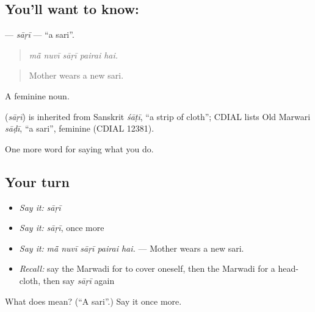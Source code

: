 \subsection*{You'll want to know: }
\textbf{} — \emph{sāṛī} — \textquotedblleft{}a sari\textquotedblright{}.

\begin{quote}
    
\end{quote}

\begin{quote}
\emph{mā̃ nuvī sāṛī pairai hai.}
\end{quote}

\begin{quote}
Mother wears a new sari.
\end{quote}

A feminine noun.

\begin{cousinweb}
\textbf{} (\emph{sāṛī}) is inherited from Sanskrit \emph{śāṭī}, \textquotedblleft{}a strip of cloth\textquotedblright{}; CDIAL lists Old Marwari \emph{sāḍī}, \textquotedblleft{}a sari\textquotedblright{}, feminine (CDIAL 12381).
\end{cousinweb}

\begin{grammarlens}[title={What you've built}]
One more word for saying what you do.
\end{grammarlens}

\subsection*{Your turn}
\begin{itemize}
\raggedright
  \item \emph{Say it:} \emph{sāṛī}
  \item \emph{Say it:} \emph{sāṛī}, once more
  \item \emph{Say it:} \emph{mā̃ nuvī sāṛī pairai hai.} — Mother wears a new sari.
  \item \emph{Recall:} say the Marwadi for to cover oneself, then the Marwadi for a head-cloth, then say \emph{sāṛī} again
\end{itemize}

\begin{tcolorbox}[breakable,colback=teal!4,colframe=teal!35!black,title={Before you move on}]
What does  mean? (\textquotedblleft{}A sari\textquotedblright{}.) Say it once more.
\end{tcolorbox}
